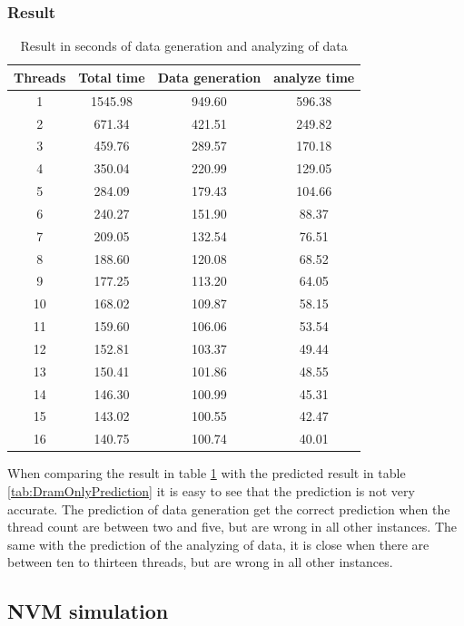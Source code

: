 \documentclass[12pt,a4paper,USenglish]{article}      %
\begin{document}
\subsubsection{Result}
\begin{table}[!hbtp]
\begin{tabular}{ |c|c|c|c| } 
\hline
Threads &  Total time & Data generation &  analyze time \\
\hline
1 & 1545.98 & 949.60 & 596.38 \\
\hline
2 & 671.34 & 421.51 & 249.82 \\
\hline
3 & 459.76 & 289.57 & 170.18 \\
\hline
4 & 350.04 & 220.99 & 129.05 \\
\hline
5 & 284.09 & 179.43 & 104.66 \\
\hline
6 & 240.27 & 151.90 & 88.37 \\
\hline
7 & 209.05 & 132.54 & 76.51 \\
\hline
8 & 188.60 & 120.08 & 68.52 \\
\hline
9 & 177.25 & 113.20 & 64.05 \\
\hline
10 & 168.02 & 109.87 & 58.15 \\
\hline
11 & 159.60 & 106.06 & 53.54 \\
\hline
12 & 152.81 & 103.37 & 49.44 \\
\hline
13 & 150.41 & 101.86 & 48.55 \\
\hline
14 & 146.30 & 100.99 & 45.31 \\
\hline
15 & 143.02 & 100.55 & 42.47 \\
\hline
16 & 140.75 & 100.74 & 40.01 \\
\hline
\end{tabular}
\caption{Result in seconds of data generation and analyzing of data}
\label{tab:DramOnlyResult}
\end{table}

When comparing the result in table \ref{tab:DramOnlyResult} with the predicted result in table \ref{tab:DramOnlyPrediction} it is easy to see that the prediction is not very accurate. The prediction of data generation get the correct prediction when the thread count are between two and five, but are wrong in all other instances. The same with the prediction of the analyzing of data, it is close when there are between ten to thirteen threads, but are wrong in all other instances. 

\clearpage
\subsection{NVM simulation}
\end{document}
